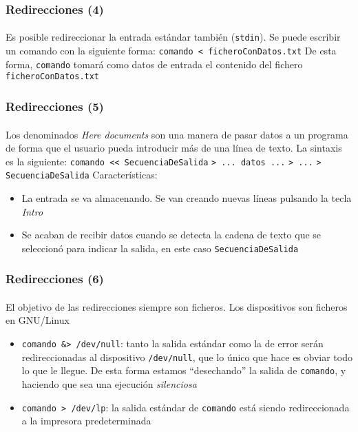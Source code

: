 \documentclass[12pt]{beamer}
\begin{document}
\begin{frame}
  \frametitle{Redirecciones (4)}
  \framesubtitle{}
  Es posible redireccionar la entrada estándar también (\texttt{stdin}). Se puede escribir un comando con la siguiente forma:
  \medskip\linebreak
  \texttt{comando < ficheroConDatos.txt}
  \medskip\linebreak
  De esta forma, \texttt{comando} tomará como datos de entrada el contenido del fichero \texttt{ficheroConDatos.txt}
\end{frame}

\begin{frame}
  \frametitle{Redirecciones (5)}
  \framesubtitle{}
  Los denominados \textit{Here documents} son una manera de pasar datos a un programa de forma que el usuario pueda introducir más de una línea de texto. La sintaxis es la siguiente:
  \medskip\linebreak
  \texttt{comando << SecuenciaDeSalida}\linebreak
  \texttt{> ... datos ...}\linebreak
  \texttt{> ...}\linebreak
  \texttt{> SecuenciaDeSalida}
  \medskip\linebreak
  Características:
  \begin{itemize}
    \item La entrada se va almacenando. Se van creando nuevas líneas pulsando la tecla \textit{Intro}
    \item Se acaban de recibir datos cuando se detecta la cadena de texto que se seleccionó para indicar la salida, en este caso \texttt{SecuenciaDeSalida}
  \end{itemize}
\end{frame}

\begin{frame}
  \frametitle{Redirecciones (6)}
  \framesubtitle{}
  El objetivo de las redirecciones siempre son ficheros. Los \alert{dispositivos son ficheros} en GNU/Linux
  \medskip
  \begin{itemize}
    \item \texttt{comando \&> /dev/null}: tanto la salida estándar como la de error serán redireccionadas al dispositivo \texttt{/dev/null}, que lo único que hace es obviar todo lo que le llegue. De esta forma estamos ``desechando'' la salida de \texttt{comando}, y haciendo que sea una ejecución \textit{silenciosa}
    \medskip
    \item \texttt{comando > /dev/lp}: la salida estándar de \texttt{comando} está siendo redireccionada a la impresora predeterminada
  \end{itemize}
\end{frame}
\end{document}
